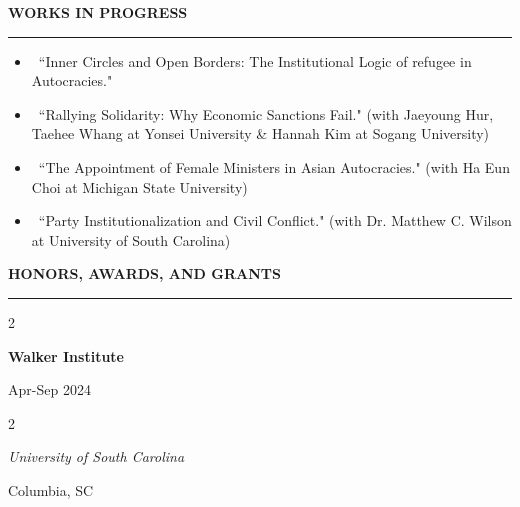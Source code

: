 \documentclass[
  16,
]{article}
\begin{document}
\begin{large}{\bf WORKS IN PROGRESS}
  \vspace{3pt}
  \hrule
\end{large}
\begin{itemize}
    \item[4.] ~``Inner Circles and Open Borders: The Institutional Logic of refugee in Autocracies."
    \item[3.] ~``Rallying Solidarity: Why Economic Sanctions Fail." (with Jaeyoung Hur, Taehee Whang at Yonsei University \& Hannah Kim at Sogang University)
    \item[2.] ~``The Appointment of Female Ministers in Asian Autocracies." (with Ha Eun Choi at Michigan State University)
    \item[1.] ~``Party Institutionalization and Civil Conflict." (with Dr. Matthew C. Wilson at University of South Carolina)
\end{itemize}

\vspace{7pt}

\begin{large}{\bf HONORS, AWARDS, AND GRANTS}
  \vspace{3pt}
  \hrule
  \begin{multicols}{2}
    \begin{flushleft}{\bf Walker Institute}\end{flushleft}
    \begin{flushright}Apr-Sep 2024\end{flushright}
  \end{multicols}
  \vspace{-0.17cm}
  \begin{multicols}{2}
    \begin{flushleft}\textit{University of South Carolina}\end
    {flushleft}\begin{flushright}Columbia, SC\end
    {flushright}
  \end{multicols}
  \end{large}
\vspace{-0.16cm}
\end{document}
